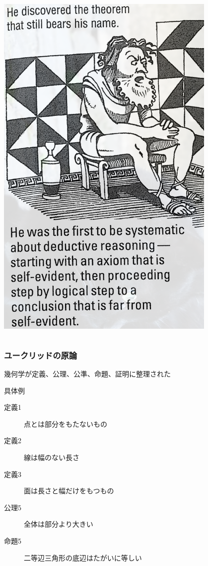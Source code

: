 \documentclass[unicode, 14pt, aspectratio=169]{beamer}
\begin{document}
\begin{frame}
\begin{columns}
\begin{column}{0.25\textwidth}
\begin{center}
      \includegraphics[width=0.8\textwidth]{images/pythagoras2.png}
    \end{center}
  \end{column}  
\end{columns}
\end{frame}
\begin{frame}
  \frametitle{ユークリッドの原論}
  {\large 幾何学が定義、公理、公準、命題、証明に整理された}
  \par
  \vspace{16pt}
  具体例
  \begin{description}
  \item[定義1] 点とは部分をもたないもの
  \item[定義2] 線は幅のない長さ
  \item[定義3] 面は長さと幅だけをもつもの
  \item[公理5] 全体は部分より大きい
  \item[命題5] 二等辺三角形の底辺はたがいに等しい
  \end{description}
\end{frame}
\end{document}

